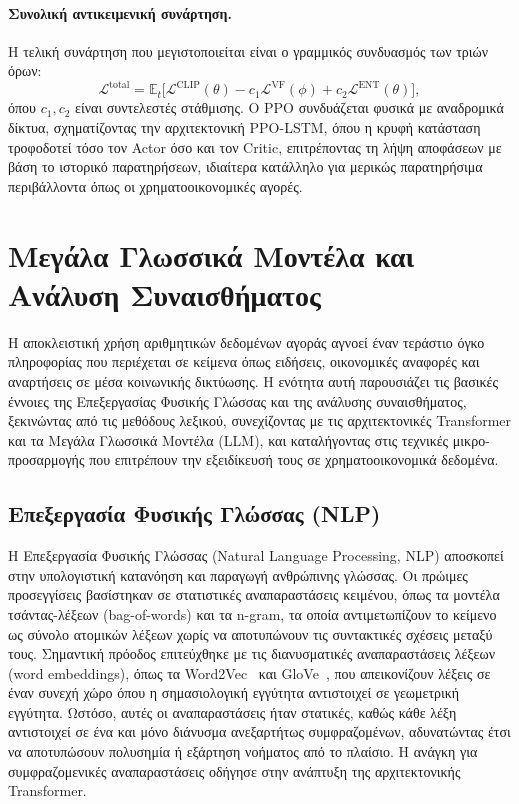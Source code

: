 \paragraph{Συνολική αντικειμενική συνάρτηση.}
Η τελική συνάρτηση που μεγιστοποιείται είναι ο γραμμικός συνδυασμός των τριών
όρων:
\begin{equation}
    \mathcal{L}^{\mathrm{total}} = \mathbb{E}_t\!\Big[
    \mathcal{L}^{\mathrm{CLIP}}(\theta)
    - c_1 \mathcal{L}^{\mathrm{VF}}(\phi)
    + c_2 \mathcal{L}^{\mathrm{ENT}}(\theta) \Big],
    \label{eq:ppo-total}
\end{equation}
όπου $c_1, c_2$ είναι συντελεστές στάθμισης. Ο PPO συνδυάζεται φυσικά με
αναδρομικά δίκτυα, σχηματίζοντας την αρχιτεκτονική PPO-LSTM, όπου η κρυφή
κατάσταση τροφοδοτεί τόσο τον Actor όσο και τον Critic, επιτρέποντας τη λήψη
αποφάσεων με βάση το ιστορικό παρατηρήσεων, ιδιαίτερα κατάλληλο για μερικώς
παρατηρήσιμα περιβάλλοντα όπως οι χρηματοοικονομικές αγορές.


\section{Μεγάλα Γλωσσικά Μοντέλα και Ανάλυση Συναισθήματος}
\label{sec:llm}

Η αποκλειστική χρήση αριθμητικών δεδομένων αγοράς αγνοεί έναν τεράστιο όγκο
πληροφορίας που περιέχεται σε κείμενα όπως ειδήσεις, οικονομικές αναφορές και
αναρτήσεις σε μέσα κοινωνικής δικτύωσης. Η ενότητα αυτή παρουσιάζει τις
βασικές έννοιες της Επεξεργασίας Φυσικής Γλώσσας και της ανάλυσης
συναισθήματος, ξεκινώντας από τις μεθόδους λεξικού, συνεχίζοντας με τις
αρχιτεκτονικές Transformer και τα Μεγάλα Γλωσσικά Μοντέλα (LLM), και
καταλήγοντας στις τεχνικές μικρο-προσαρμογής που επιτρέπουν την εξειδίκευσή
τους σε χρηματοοικονομικά δεδομένα.


\subsection{Επεξεργασία Φυσικής Γλώσσας (NLP)}
\label{subsec:nlp}

Η Επεξεργασία Φυσικής Γλώσσας (Natural Language
Processing, NLP) αποσκοπεί στην υπολογιστική κατανόηση και παραγωγή
ανθρώπινης γλώσσας. Οι πρώιμες προσεγγίσεις βασίστηκαν σε στατιστικές
αναπαραστάσεις κειμένου, όπως τα μοντέλα τσάντας-λέξεων (bag-of-words) και
τα n-gram, τα οποία αντιμετωπίζουν το κείμενο ως σύνολο ατομικών λέξεων χωρίς
να αποτυπώνουν τις συντακτικές σχέσεις μεταξύ τους. Σημαντική πρόοδος
επιτεύχθηκε με τις διανυσματικές αναπαραστάσεις λέξεων (word embeddings), όπως
τα Word2Vec~\cite{mikolov2013word2vec} και GloVe~\cite{pennington2014glove}, που απεικονίζουν λέξεις σε έναν συνεχή χώρο όπου η
σημασιολογική εγγύτητα αντιστοιχεί σε γεωμετρική εγγύτητα. Ωστόσο, αυτές οι
αναπαραστάσεις ήταν στατικές, καθώς κάθε λέξη αντιστοιχεί σε ένα και μόνο
διάνυσμα ανεξαρτήτως συμφραζομένων, αδυνατώντας έτσι να αποτυπώσουν πολυσημία
ή εξάρτηση νοήματος από το πλαίσιο. Η ανάγκη για συμφραζομενικές
αναπαραστάσεις οδήγησε στην ανάπτυξη της αρχιτεκτονικής Transformer.


